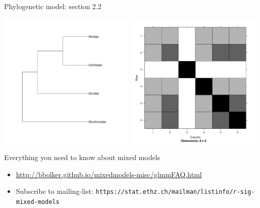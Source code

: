 \documentclass{beamer}
\begin{document}
\begin{frame}{Phylogenetic model: section 2.2}
    \begin{center}
        \includegraphics[width=0.49\textwidth]{figure/phylogeny}
        \includegraphics[width=0.49\textwidth]{figure/matphylo}
    \end{center}    
\end{frame}



\begin{frame}{Everything you need to know about mixed models}

\begin{itemize}
 \item \url{http://bbolker.github.io/mixedmodels-misc/glmmFAQ.html}
 \item Subscribe to mailing-list: \texttt{https://stat.ethz.ch/mailman/listinfo/r-sig-mixed-models}
\end{itemize}

\end{frame}
\end{document}
